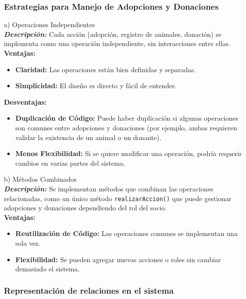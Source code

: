 \subsubsection{Estrategias para Manejo de Adopciones y Donaciones}

\textbf{}{a) Operaciones Independientes}\\

\textit{\textbf{Descripción:} } 
Cada acción (adopción, registro de animales, donación) se implementa como una operación independiente, sin interacciones entre ellas.\\

\textbf{Ventajas:}
\begin{itemize}
    \item \textbf{Claridad:} Las operaciones están bien definidas y separadas.
    \item \textbf{Simplicidad:} El diseño es directo y fácil de entender.
\end{itemize}

\textbf{Desventajas:}
\begin{itemize}
    \item \textbf{Duplicación de Código:} Puede haber duplicación si algunas operaciones son comunes entre adopciones y donaciones (por ejemplo, ambas requieren validar la existencia de un animal o un donante).
    \item \textbf{Menos Flexibilidad:} Si se quiere modificar una operación, podría requerir cambios en varias partes del sistema.
\end{itemize}

\textbf{}{b) Métodos Combinados}\\

\textit{\textbf{Descripción:}  }
Se implementan métodos que combinan las operaciones relacionadas, como un único método \texttt{realizarAccion()} que puede gestionar adopciones y donaciones dependiendo del rol del socio.\\

\textbf{Ventajas:}
\begin{itemize}
    \item \textbf{Reutilización de Código:} Las operaciones comunes se implementan una sola vez.
    \item \textbf{Flexibilidad:} Se pueden agregar nuevas acciones o roles sin cambiar demasiado el sistema.
\end{itemize}

\subsubsection{Representación de relaciones en el sistema}

